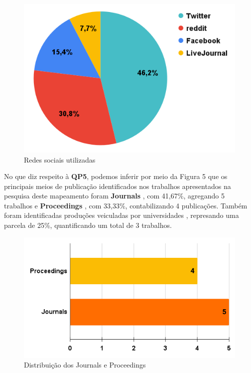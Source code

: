 \documentclass[conference]{IEEEtran}
\begin{document}
\begin{figure}[h]
    \centering
    \includegraphics[scale=0.4]{images/redes-sociais-utilizadas.png}
    \caption{Redes sociais utilizadas}
    \label{fig:redes-sociais-utilizadas}
\end{figure}

No que diz respeito à \textbf{QP5}, podemos inferir por meio da Figura 5 que os principais meios de publicação identificados nos trabalhos apresentados na pesquisa deste mapeamento foram \textbf{Journals} \cite{ArtigoN2, ArtigoN3, ArtigoN4, ArtigoN5, ArtigoN11}, com 41,67\%, agregando 5 trabalhos e \textbf{Proceedings} \cite{ArtigoN1, ArtigoN6, ArtigoN10, ArtigoN12}, com 33,33\%, contabilizando 4 publicações. Também foram identificadas produções veiculadas por universidades \cite{ArtigoN7, ArtigoN8, ArtigoN9}, represando uma parcela de 25\%, quantificando um total de 3 trabalhos.

\begin{figure}[h]
    \centering
    \includegraphics[scale=0.4]{images/distribuicao-journals-proceedings.png}
    \caption{Distribuição dos Journals e Proceedings}
    \label{fig:distribuicao-journals-proceedings}
\end{figure}
\end{document}
